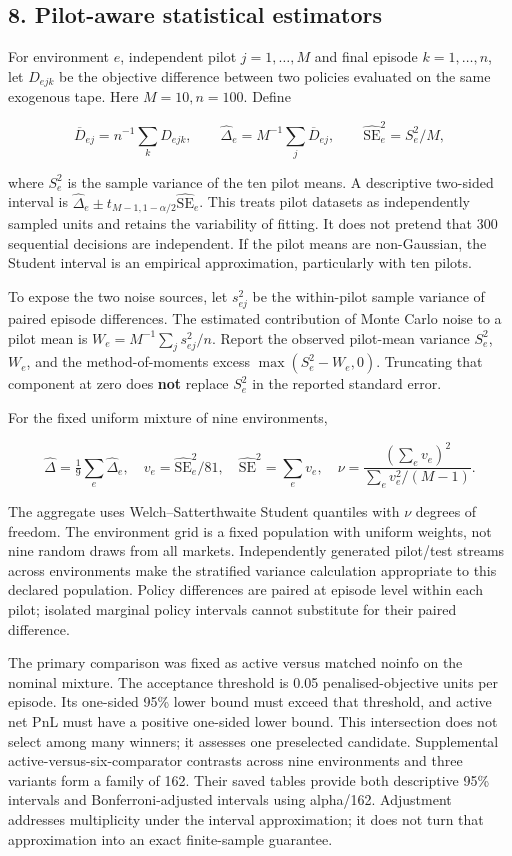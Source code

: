 \documentclass[
  10pt,
  a4paper,
]{article}
\begin{document}
\subsection{8. Pilot-aware statistical
estimators}\label{pilot-aware-statistical-estimators}

For environment \(e\), independent pilot \(j=1,\ldots,M\) and final
episode \(k=1,\ldots,n\), let \(D_{ejk}\) be the objective difference
between two policies evaluated on the same exogenous tape. Here
\(M=10,n=100\). Define

\[
\overline D_{ej}=n^{-1}\sum_kD_{ejk},\qquad
\widehat\Delta_e=M^{-1}\sum_j\overline D_{ej},\qquad
\widehat{\mathrm{SE}}_e^2=S_e^2/M,
\]

where \(S_e^2\) is the sample variance of the ten pilot means. A
descriptive two-sided interval is
\(\widehat\Delta_e\pm t_{M-1,1-\alpha/2}\widehat{\mathrm{SE}}_e\). This
treats pilot datasets as independently sampled units and retains the
variability of fitting. It does not pretend that 300 sequential
decisions are independent. If the pilot means are non-Gaussian, the
Student interval is an empirical approximation, particularly with ten
pilots.

To expose the two noise sources, let \(s_{ej}^2\) be the within-pilot
sample variance of paired episode differences. The estimated
contribution of Monte Carlo noise to a pilot mean is
\(W_e=M^{-1}\sum_j s_{ej}^2/n\). Report the observed pilot-mean variance
\(S_e^2\), \(W_e\), and the method-of-moments excess
\(\max(S_e^2-W_e,0)\). Truncating that component at zero does
\textbf{not} replace \(S_e^2\) in the reported standard error.

For the fixed uniform mixture of nine environments,

\[
\widehat\Delta=\tfrac19\sum_e\widehat\Delta_e,\quad
v_e=\widehat{\mathrm{SE}}_e^2/81,\quad
\widehat{\mathrm{SE}}^2=\sum_ev_e,\quad
\nu=\frac{(\sum_ev_e)^2}{\sum_ev_e^2/(M-1)}.
\]

The aggregate uses Welch--Satterthwaite Student quantiles with \(\nu\)
degrees of freedom. The environment grid is a fixed population with
uniform weights, not nine random draws from all markets. Independently
generated pilot/test streams across environments make the stratified
variance calculation appropriate to this declared population. Policy
differences are paired at episode level within each pilot; isolated
marginal policy intervals cannot substitute for their paired difference.

The primary comparison was fixed as active versus matched noinfo on the
nominal mixture. The acceptance threshold is 0.05 penalised-objective
units per episode. Its one-sided 95\% lower bound must exceed that
threshold, and active net PnL must have a positive one-sided lower
bound. This intersection does not select among many winners; it assesses
one preselected candidate. Supplemental active-versus-six-comparator
contrasts across nine environments and three variants form a family of
162. Their saved tables provide both descriptive 95\% intervals and
Bonferroni-adjusted intervals using alpha/162. Adjustment addresses
multiplicity under the interval approximation; it does not turn that
approximation into an exact finite-sample guarantee.
\end{document}

